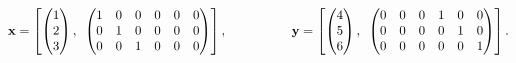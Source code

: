 \begin{equation}
    \label{def:VectorAD}
    \textbf{x} = \left[\begin{pmatrix}1\\2\\3
    \end{pmatrix},\hspace{0.5em}\begin{pmatrix}
    1&0&0&0&0&0\\
    0&1&0&0&0&0\\
    0&0&1&0&0&0\end{pmatrix} \right],
    \hspace{5em}
    \textbf{y} = \left[\begin{pmatrix}4\\5\\6
    \end{pmatrix},\hspace{0.5em}\begin{pmatrix}
    0&0&0&1&0&0\\
    0&0&0&0&1&0\\
    0&0&0&0&0&1\end{pmatrix} \right].
\end{equation}

